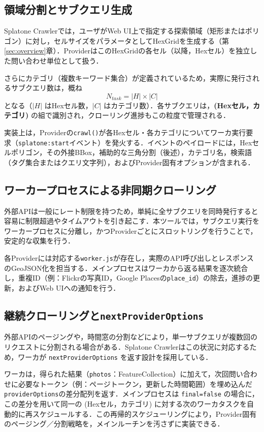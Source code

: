 \documentclass[11pt,a4paper]{jlreq}
\begin{document}
\subsection{領域分割とサブクエリ生成}
Splatone Crawlerでは，ユーザがWeb UI上で指定する探索領域（矩形またはポリゴン）に対し，セルサイズをパラメータとしてHexGridを生成する（第\ref{sec:overview}章）．ProviderはこのHexGridの各セル（以降，Hexセル）を独立した問い合わせ単位として扱う．

さらにカテゴリ（複数キーワード集合）が定義されているため，実際に発行されるサブクエリ数は，概ね
$$
N_{task} = |H| \times |C|
$$
となる（$|H|$ はHexセル数，$|C|$ はカテゴリ数）．各サブクエリは，\textbf{(Hexセル，カテゴリ)} の組で識別され，クローリング進捗もこの粒度で管理される．

実装上は，Providerの\texttt{crawl()}が各Hexセル・各カテゴリについてワーカ実行要求（\texttt{splatone:start}イベント）を発火する．イベントのペイロードには，Hexセルポリゴン，その外接BBox，補助的な三角分割（後述），カテゴリ名，検索語（タグ集合またはクエリ文字列），およびProvider固有オプションが含まれる．

\subsection{ワーカープロセスによる非同期クローリング}
外部APIは一般にレート制限を持つため，単純に全サブクエリを同時発行すると容易に制限超過やタイムアウトを引き起こす．本ツールでは，サブクエリ実行をワーカープロセスに分離し，かつProviderごとにスロットリングを行うことで，安定的な収集を行う．

各Providerには対応する\texttt{worker.js}が存在し，実際のAPI呼び出しとレスポンスのGeoJSON化を担当する．メインプロセスはワーカから返る結果を逐次統合し，重複ID（例：Flickrの写真ID，Google Placesの\texttt{place\_id}）の除去，進捗の更新，およびWeb UIへの通知を行う．

\subsection{継続クローリングと\texttt{nextProviderOptions}}
外部APIのページングや，時間窓の分割などにより，単一サブクエリが複数回のリクエストに分割される場合がある．Splatone Crawlerはこの状況に対応するため，ワーカが \texttt{nextProviderOptions} を返す設計を採用している．

ワーカは，得られた結果（\texttt{photos}：FeatureCollection）に加えて，次回問い合わせに必要なトークン（例：ページトークン，更新した時間範囲）を埋め込んだ\texttt{providerOptions}の差分配列を返す．メインプロセスは \texttt{final=false} の場合に，この差分を用いて同一の (Hexセル，カテゴリ) に対する次のワーカタスクを自動的に再スケジュールする．この再帰的スケジューリングにより，Provider固有のページング／分割戦略を，メインルーチンを汚さずに実装できる．
\end{document}
